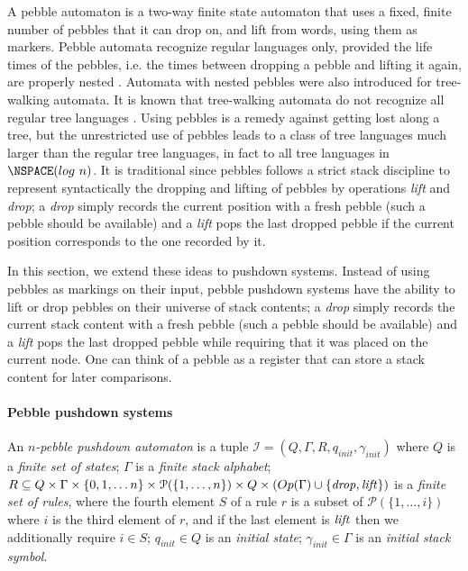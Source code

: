 \documentclass[a4paper,UKenglish,cleveref, autoref, thm-restate]{lipics-v2021}
\newcommand{\Op}{\mathsf{Op}}
\begin{document}
A pebble automaton is a two-way finite state automaton that uses a fixed, finite number of
pebbles that it can drop on, and lift from 
words, using them as markers.
Pebble automata recognize regular languages only, provided the life times of the pebbles, i.e. the times between dropping a pebble and lifting it again, are properly nested
\cite{globerman1996complexity, engelfriet1999tree}.
Automata with nested pebbles were also introduced
for tree-walking automata. 
It is known that tree-walking automata do not recognize all regular tree languages \cite{bojanczyk2008tree}.
Using pebbles is a remedy against getting lost along a tree, but 
the unrestricted use of pebbles leads to a class of tree languages much larger than the
regular tree languages, in fact to all tree languages in $\NSPACE(log ~ n)$.
It is traditional since pebbles follows a strict stack discipline to represent syntactically the dropping and lifting of pebbles by operations \textit{lift} and \textit{drop}; a \textit{drop} simply records the current position with a fresh pebble (such a pebble should be available)  and a \textit{lift} pops the last dropped pebble if the current position corresponds to the one recorded by it.




In this section, we extend these ideas to pushdown systems. Instead of using pebbles as markings on their input, pebble pushdown systems have the ability to lift or drop pebbles on their universe of stack contents; a \textit{drop} simply records the current stack content with a fresh pebble (such a pebble should be available)  
and a \textit{lift} pops the last dropped pebble 
while requiring that
 it was placed on the current node. 
One can think of a pebble as a register that can store a stack content for later comparisons.





\paragraph*{Pebble pushdown systems}

\newcommand{\ppda}{\mathcal{I}}


An {\em $n$-pebble pushdown automaton} 
is a tuple 
$\ppda = (Q, \Gamma,  R, q_{init}, \gamma_{init})$
where $Q$ is a {\em finite set of  states}; $\Gamma$ is a {\em finite stack alphabet};
  $R  \subseteq  Q  \times \Gamma \times
		 \{ 0, 1, \ldots n\} \times \mathcal{P}(\{1,\ldots,n\})
		 \times Q  \times (\Op(\Gamma) \cup \{\text{\textit{drop}}, \text{\textit{lift}}\})$ is a {\em finite set of rules},
		 where the fourth element $S$ of a rule $r$ is a subset of 
		$\mathcal{P}(\{1,\ldots,i\})$ where $i$ is the third element of $r$,
		and if the last element is
		$\text{\textit{lift}}$ then we additionally require $i \in S$;
 $q_{init} \in Q$ is an {\em initial  state};
 $\gamma_{init} \in \Gamma$ is an {\em initial stack symbol}.
\end{document}
